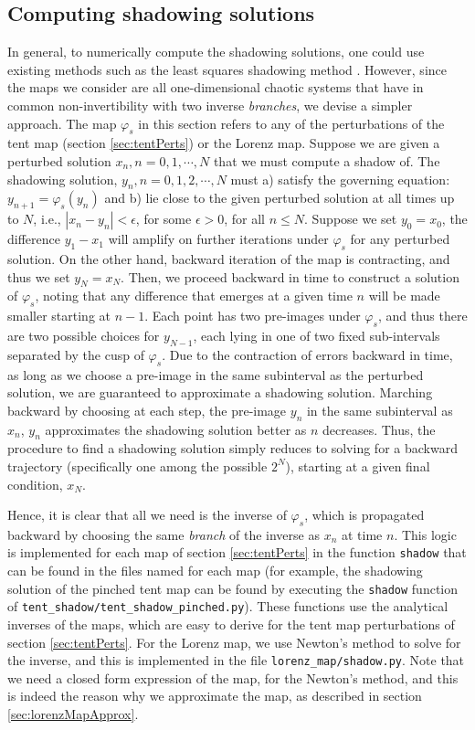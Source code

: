 \subsection{Computing shadowing solutions}
\label{sec:computingShadowing}
		In general, to numerically compute the shadowing solutions, one could use existing methods such as 
		the least squares shadowing method \cite{qiqi-lss}. However, since the  maps we consider are all one-dimensional chaotic systems that have in common non-invertibility with two inverse \emph{branches}, we devise a simpler approach. The map $\varphi_s$ in this section refers to any of the perturbations of the tent map (section \ref{sec:tentPerts}) or the Lorenz map. Suppose we are given a perturbed solution $x_n, n =0,1,\cdots,N$ that we must compute a shadow of. 
The shadowing solution, $y_n, n=0,1,2,\cdots,N$ 
must a) satisfy the governing equation: $y_{n+1} = \varphi_s(y_n)$
and b) lie close to the given perturbed solution at all times up to 
$N$, i.e., $|x_n - y_n| < \epsilon$, for some $\epsilon > 0$, for all $n \leq N$. Suppose we set $y_0 = x_0$, the difference $y_1 - x_1$ will amplify on further iterations under $\varphi_s$ for any perturbed solution. On the other hand, backward iteration of the map is contracting, and thus we set $y_N = x_N$. Then, we proceed backward in time to 
construct a solution of $\varphi_s$, noting that any difference that emerges at a given time $n$ will be made smaller starting at $n-1$. Each point has two pre-images under $\varphi_s$, and thus there are two possible choices for $y_{N-1}$, each lying in one of two fixed sub-intervals separated by the cusp of $\varphi_s$. Due to the contraction of errors backward in time, as long as we choose a pre-image in the same subinterval as the perturbed solution, we are guaranteed to approximate a shadowing solution. Marching backward by choosing at each step, the pre-image $y_n$ in the same subinterval as $x_n$, $y_n$ approximates the shadowing solution better as $n$ decreases. Thus, the procedure to find a shadowing solution simply reduces to solving for a backward trajectory (specifically one among the possible $2^N$), starting at a given final condition,  $x_N$.
	
		Hence, it is clear that all we need is the inverse of 
		$\varphi_s$, which is propagated backward by choosing the same \emph{branch} of the inverse as $x_n$ at time $n$. This logic is implemented for each map of section \ref{sec:tentPerts} in the function \verb+shadow+ that can be found in the files named for each map (for example, the shadowing solution of the pinched tent map can be found by executing the \verb+shadow+ function of \verb+tent_shadow/tent_shadow_pinched.py+). These functions use the analytical inverses of the maps, which are easy to derive for the tent map perturbations of section \ref{sec:tentPerts}. For the Lorenz map, we use Newton's method to solve for the inverse, and this is implemented in the file \verb+lorenz_map/shadow.py+. Note that we need a closed form expression of the map, for the Newton's method, and this is indeed the reason why we approximate the map, as described in section \ref{sec:lorenzMapApprox}.

